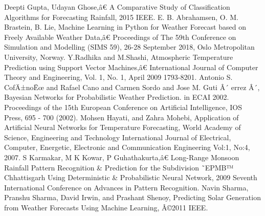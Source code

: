 \documentclass[conference, onecolumn]{IEEEtran}
\begin{document}
\begin{thebibliography}{00}
 Deepti Gupta, Udayan Ghose,â€ A Comparative Study of Classification Algorithms for Forecasting Rainfall, 2015 IEEE.
 E. B. Abrahamsen, O. M. Brastein, B. Lie, Machine Learning in Python for Weather Forecast based on Freely Available Weather Data,â€ Proceedings of The 59th Conference on Simulation and Modelling (SIMS 59), 26-28 September 2018, Oslo Metropolitan University, Norway.
 Y.Radhika and M.Shashi, Atmospheric Temperature Prediction using Support Vector Machines,â€ International Journal of Computer Theory and Engineering, Vol. 1, No. 1, April 2009 1793-8201.
 Antonio S. CofÄ±noËœ and Rafael Cano and Carmen Sordo and Jose M. Guti Â´ errez Â´, Bayesian Networks for Probabilistic Weather Prediction. in ECAI 2002. Proceedings of the 15th European Conference on Artificial Intelligence, IOS Press, 695 - 700 (2002).
 Mohsen Hayati, and Zahra Mohebi, Application of Artificial Neural Networks for Temperature Forecasting, World Academy of Science, Engineering and Technology International Journal of Electrical, Computer, Energetic, Electronic and Communication Engineering Vol:1, No:4, 2007.
 S Karmakar, M K Kowar, P Guhathakurta,â€ Long-Range Monsoon Rainfall Pattern Recognition \& Prediction for the Subdivision ˜EPMB™ Chhattisgarh Using Deterministic \& Probabilistic Neural Network, 2009 Seventh International Conference on Advances in Pattern Recognition.
 Navin Sharma, Pranshu Sharma, David Irwin, and Prashant Shenoy, Predicting Solar Generation from Weather Forecasts Using Machine Learning, Â©2011 IEEE.
\end{thebibliography}
\vspace{12pt}
\color{red}
\end{document}
